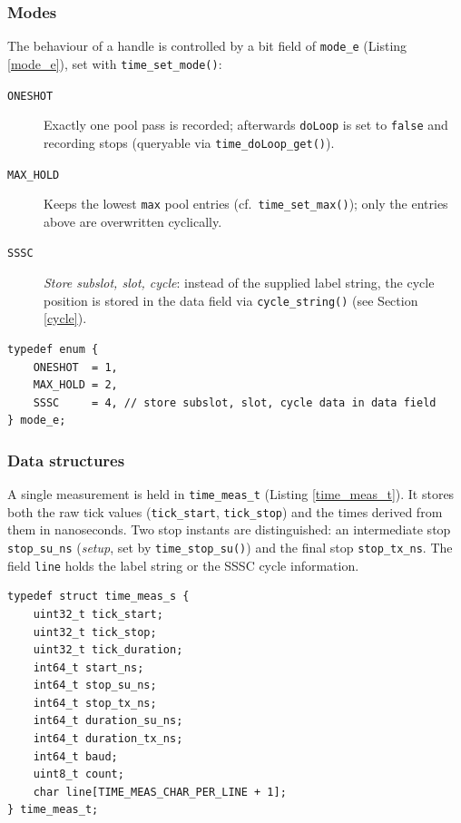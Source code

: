 \subsubsection*{Modes}
The behaviour of a handle is controlled by a bit field of \verb|mode_e|
(Listing \ref{mode_e}), set with \verb|time_set_mode()|:
\begin{description}
\item[\texttt{ONESHOT}] Exactly one pool pass is recorded; afterwards
  \verb|doLoop| is set to \verb|false| and recording stops (queryable via
  \verb|time_doLoop_get()|).
\item[\texttt{MAX\_HOLD}] Keeps the lowest \verb|max| pool entries (cf.\
  \verb|time_set_max()|); only the entries above are overwritten cyclically.
\item[\texttt{SSSC}] \emph{Store subslot, slot, cycle}: instead of the
  supplied label string, the cycle position is stored in the data field via
  \verb|cycle_string()| (see Section \ref{cycle}).
\end{description}

\begin{listing}
\begin{verbatim}
typedef enum {
    ONESHOT  = 1,
    MAX_HOLD = 2,
    SSSC     = 4, // store subslot, slot, cycle data in data field
} mode_e;
\end{verbatim}
\caption{Operating modes \texttt{mode\_e}}
\label{mode_e}
\end{listing}

\subsubsection*{Data structures}
A single measurement is held in \verb|time_meas_t| (Listing
\ref{time_meas_t}). It stores both the raw tick values (\verb|tick_start|,
\verb|tick_stop|) and the times derived from them in nanoseconds. Two stop
instants are distinguished: an intermediate stop \verb|stop_su_ns|
(\emph{setup}, set by \verb|time_stop_su()|) and the final stop
\verb|stop_tx_ns|. The field \verb|line| holds the label string or the SSSC
cycle information.

\begin{listing}
\begin{verbatim}
typedef struct time_meas_s {
    uint32_t tick_start;
    uint32_t tick_stop;
    uint32_t tick_duration;
    int64_t start_ns;
    int64_t stop_su_ns;
    int64_t stop_tx_ns;
    int64_t duration_su_ns;
    int64_t duration_tx_ns;
    int64_t baud;
    uint8_t count;
    char line[TIME_MEAS_CHAR_PER_LINE + 1];
} time_meas_t;
\end{verbatim}
\caption{Definition of the \texttt{time\_meas\_t} structure}
\label{time_meas_t}
\end{listing}

